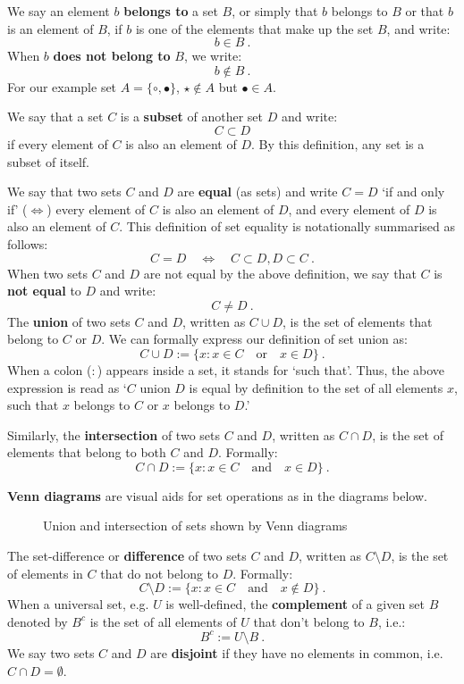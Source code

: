 We say an element $b$ {\bf belongs to} a set $B$, or simply that $b$ belongs to $B$ or that $b$ is an element of $B$, if $b$ is one of the elements that make up the set $B$, and write:
\[
\boxed{
b \in B
} \ .
\]
When $b$ {\bf does not belong to} $B$, we write:
\[
\boxed{
b \notin B
} \ .
\]
For our example set $A = \{\circ, \bullet\}$, $\star \notin A$ but $\bullet \in A$.

We say that a set $C$ is a {\bf subset} of another set $D$ and write:
\[
\boxed{
C \subset D
}
\]
if every element of $C$ is also an element of $D$.  By this definition, any set is a subset of itself.

We say that two sets $C$ and $D$ are {\bf equal} (as sets) and write $C=D$ `if and only if' ($\iff$) every element of $C$ is also an element of $D$, and every element of $D$ is also an element of $C$.  This definition of set equality is notationally summarised as follows:
\[
\boxed{
C=D \quad \iff \quad C \subset D , D \subset C
} \ .
\]
When two sets $C$ and $D$ are not equal by the above definition, we say that $C$ is {\bf not equal} to $D$ and write:
\[
\boxed{
C \neq D
} \ .
\]
The {\bf union} of two sets $C$ and $D$, written as $C \cup D$, is the set of elements that belong to $C$ or $D$.  We can formally express our definition of set union as:
\[
\boxed{
C \cup D := \{x: x \in C \quad \text{or} \quad x\in D \}
} \ .
\]
When a colon ($:$) appears inside a set, it stands for `such that'.  Thus, the above expression is read as `$C$ union $D$ is equal by definition to the set of all elements $x$, such that $x$ belongs to $C$ or $x$ belongs to $D$.'

Similarly, the {\bf intersection} of two sets $C$ and $D$, written as $C \cap D$, is the set of elements that belong to both $C$ and $D$.  Formally:
\[
\boxed{
C \cap D := \{x: x \in C \quad \text{and} \quad x\in D \}
} \ .
\]

{\bf Venn diagrams} are visual aids for set operations as in the diagrams below.

\begin{figure}[htbp]
\centering
\caption{Union and intersection of sets shown by Venn diagrams}
\end{figure}



The set-difference or {\bf difference} of two sets $C$ and $D$, written as $C \setminus D$, is the set of elements in $C$ that do not belong to $D$.  Formally:
\[
\boxed{
C \setminus D := \{x: x \in C \quad \text{and} \quad x\notin D \}
} \ .
\]
When a universal set, e.g. $U$ is well-defined, the {\bf complement} of a given set $B$ denoted by $B^c$ is the set of all elements of $U$ that don't belong to $B$, i.e.:
\[
\boxed{
B^c := U \setminus B
} \ .
\]
We say two sets $C$ and $D$ are {\bf disjoint} if they have no elements in common, i.e.~$C \cap D = \emptyset$.

